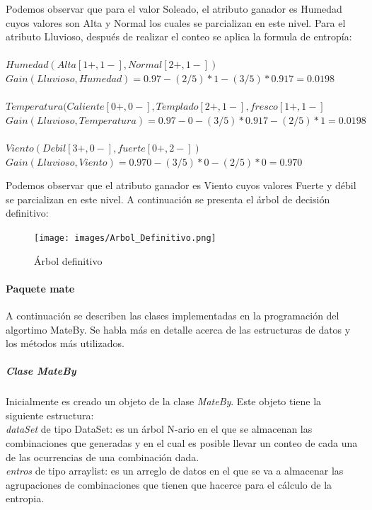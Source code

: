 Podemos observar que para el valor Soleado, el atributo ganador es Humedad cuyos valores son Alta y Normal los
cuales se parcializan en este nivel. Para el atributo Lluvioso, despu\'es de realizar el conteo se aplica la
formula de entrop\'ia:\\ \\

$Humedad(Alta[1+,1-], Normal[2+,1-])$\\
$Gain(Lluvioso,Humedad)=0.97-(2/5)*1-(3/5)*0.917= 0.0198$\\ \\
$Temperatura(Caliente[0+,0-],Templado[2+,1-],fresco[1+,1-]$\\
$Gain(Lluvioso,Temperatura)=0.97-0-(3/5)*0.917-(2/5)*1=0.0198$\\ \\
$Viento(Debil[3+,0-], fuerte[0+,2-])$\\
$Gain(Lluvioso,Viento)=0.970-(3/5)*0-(2/5)*0=0.970$

Podemos observar que el atributo ganador es Viento cuyos valores Fuerte y d\'ebil se parcializan en este nivel. A
continuaci\'on se presenta el \'arbol de decisi\'on definitivo:

\begin{figure}[!h]
\centering
\texttt{[image: images/Arbol\_Definitivo.png]}
\caption{\'Arbol definitivo}
\label{grac455}
\end{figure}
\paragraph{Paquete mate}
A continuaci\'on se describen las clases implementadas en la programaci\'on del algortimo MateBy. Se habla m\'as
en detalle acerca de las estructuras de datos y los m\'etodos m\'as utilizados.

\subparagraph{Clase MateBy}
Inicialmente es creado un objeto de la clase \textit{MateBy}. Este objeto tiene la siguiente estructura:\\

\textit{dataSet} de tipo DataSet: es un \'arbol N-ario en el que se almacenan las combinaciones que generadas y en
el cual es posible llevar un conteo de cada una de las ocurrencias de una combinaci\'on dada.\\

\textit{entros} de tipo arraylist: es un arreglo de datos en el que se va a almacenar las agrupaciones de
combinaciones que tienen que hacerce para el c\'alculo de la entropia.\\

